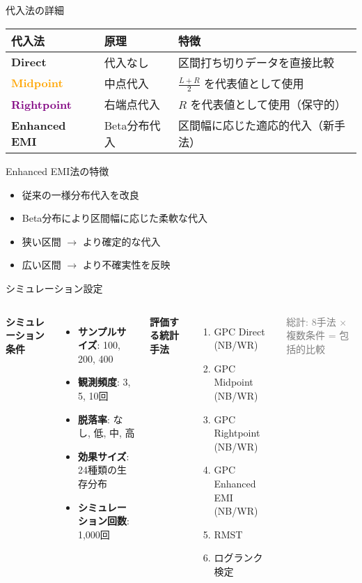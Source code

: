 \documentclass[11pt,aspectratio=169]{beamer}
\begin{document}
\begin{frame}{代入法の詳細}
\begin{table}[h]
\centering
\begin{tabular}{|l|l|p{6cm}|}
\hline
\textbf{代入法} & \textbf{原理} & \textbf{特徴} \\
\hline
\textcolor{primary}{\textbf{Direct}} & 代入なし & 区間打ち切りデータを直接比較 \\
\hline
\textcolor{orange}{\textbf{Midpoint}} & 中点代入 & $\frac{L + R}{2}$ を代表値として使用 \\
\hline
\textcolor{purple}{\textbf{Rightpoint}} & 右端点代入 & $R$ を代表値として使用（保守的） \\
\hline
\textcolor{accent}{\textbf{Enhanced EMI}} & Beta分布代入 & 区間幅に応じた適応的代入（新手法） \\
\hline
\end{tabular}
\end{table}

\vspace{1em}

\begin{block}{Enhanced EMI法の特徴}
\begin{itemize}
\item 従来の一様分布代入を改良
\item Beta分布により区間幅に応じた柔軟な代入
\item 狭い区間 $\rightarrow$ より確定的な代入
\item 広い区間 $\rightarrow$ より不確実性を反映
\end{itemize}
\end{block}
\end{frame}

\begin{frame}{シミュレーション設定}
\begin{columns}
\textbf{シミュレーション条件}
\begin{itemize}
\item \textbf{サンプルサイズ}: 100, 200, 400
\item \textbf{観測頻度}: 3, 5, 10回
\item \textbf{脱落率}: なし, 低, 中, 高
\item \textbf{効果サイズ}: 24種類の生存分布
\item \textbf{シミュレーション回数}: 1,000回
\end{itemize}

\textbf{評価する統計手法}
\begin{enumerate}
\item GPC Direct (NB/WR)
\item GPC Midpoint (NB/WR)
\item GPC Rightpoint (NB/WR)
\item GPC Enhanced EMI (NB/WR)
\item RMST
\item ログランク検定
\end{enumerate}

\vspace{0.5em}
\textcolor{gray}{\small 総計: 8手法 × 複数条件 = 包括的比較}
\end{columns}
\end{frame}
\end{document}
